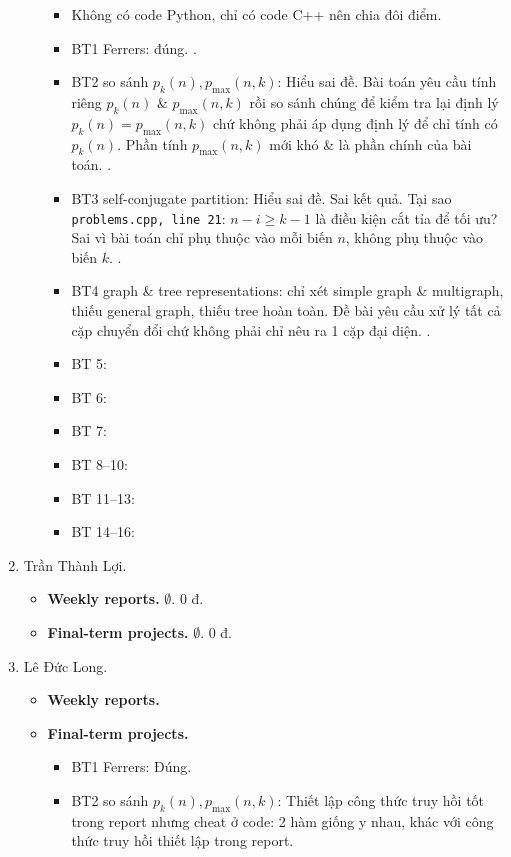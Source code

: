 \documentclass{article}
\begin{document}
\begin{enumerate}
\begin{itemize}
        \begin{itemize}
            \item Không có code Python, chỉ có code C++ nên chia đôi điểm.
            \item BT1 Ferrers: đúng. .
            \item BT2 so sánh $p_k(n),p_{\max}(n,k)$: Hiểu sai đề. Bài toán yêu cầu tính riêng $p_k(n)$ \& $p_{\max}(n,k)$ rồi so sánh chúng để kiểm tra lại định lý $p_k(n) = p_{\max}(n,k)$ chứ không phải áp dụng định lý để chỉ tính có $p_k(n)$. Phần tính $p_{\max}(n,k)$ mới khó \& là phần chính  của bài toán. .
            \item BT3 self-conjugate partition: Hiểu sai đề. Sai kết quả. Tại sao {\tt problems.cpp, line 21}: $n - i\ge k - 1$ là điều kiện cắt tỉa để tối ưu? Sai vì bài toán chỉ phụ thuộc vào mỗi biến $n$, không phụ thuộc vào biến $k$. .
            \item BT4 graph \& tree representations: chỉ xét simple graph \& multigraph, thiếu general graph, thiếu tree hoàn toàn. Đề bài yêu cầu xử lý tất cả cặp chuyển đổi chứ không phải chỉ nêu ra 1 cặp đại diện. .
            \item BT 5:
            \item BT 6:
            \item BT 7:
            \item BT 8--10:
            \item BT 11--13:
            \item BT 14--16:
        \end{itemize}
    \end{itemize}
    \item {\sc Trần Thành Lợi.}
    \begin{itemize}
        \item {\bf Weekly reports.} $\emptyset$. 0 đ.
        \item {\bf Final-term projects.} $\emptyset$. 0 đ.
    \end{itemize}
    \item {\sc Lê Đức Long.}
    \begin{itemize}
        \item {\bf Weekly reports.}
        \item {\bf Final-term projects.}
        \begin{itemize}
            \item BT1 Ferrers: Đúng.
            \item BT2 so sánh $p_k(n),p_{\max}(n,k)$: Thiết lập công thức truy hồi tốt trong report nhưng cheat ở code: 2 hàm giống y nhau, khác với công thức truy hồi thiết lập trong report.

\end{itemize}
\end{itemize}
\end{enumerate}
\end{document}
